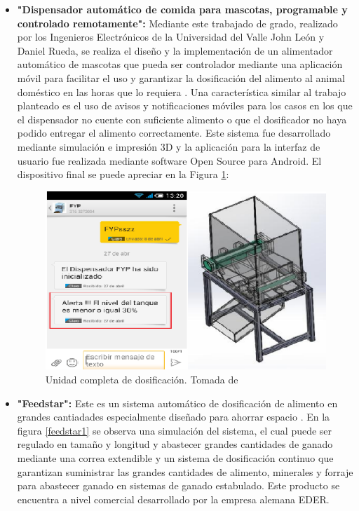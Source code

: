 \begin{itemize}
\item \textbf{"Dispensador automático de comida para mascotas, programable y controlado remotamente":} Mediante este trabajado de grado, realizado por los Ingenieros Electrónicos de la Universidad del Valle John León y Daniel Rueda, se realiza el diseño y la implementación de un alimentador automático de mascotas que pueda ser controlador mediante una aplicación móvil para facilitar el uso y garantizar la dosificación del alimento al animal doméstico  en las horas que lo requiera \cite{univalle1}. Una característica similar al trabajo planteado es el uso de avisos y notificaciones móviles para los casos en los que el dispensador no cuente con suficiente alimento o que el dosificador no haya podido entregar el alimento correctamente.
Este sistema fue desarrollado mediante simulación e impresión 3D y la aplicación para la interfaz de usuario fue realizada mediante software Open Source para Android. El dispositivo final se puede apreciar en la Figura \ref{univalle1}:

			\begin{figure}[H]
			\begin{center}
			 \includegraphics[scale=0.45]{img/univalle1png.png}
			\end{center}
			\caption{Unidad completa de dosificación. Tomada de \cite{univalle1} \label{univalle1}}
			\end{figure}			
			
\item \textbf{"Feedstar":} Este es un sistema automático de dosificación de alimento en grandes cantiadades especialmente diseñado para ahorrar espacio \cite{feedstar}. En la figura \ref{feedstar1} se observa una simulación del sistema, el cual puede ser regulado en tamaño y longitud y abastecer grandes cantidades de ganado mediante una correa extendible y un sistema de dosificación continuo que garantizan suministrar las grandes cantidades de alimento, minerales y forraje para abastecer ganado en sistemas de ganado estabulado. Este producto se encuentra a nivel comercial desarrollado por la empresa alemana EDER. 


\end{itemize}
